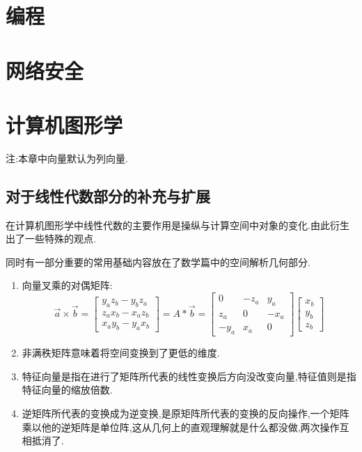 \documentclass[UTF8,12pt]{ctexbook}
\begin{document}
{{  \section{编程}{


   }%

  \section{网络安全}{


   }%

  \section{计算机图形学}{
    注:本章中向量默认为列向量.

    \subsection{对于线性代数部分的补充与扩展}{

      在计算机图形学中线性代数的主要作用是操纵与计算空间中对象的变化.由此衍生出了一些特殊的观点.

      同时有一部分重要的常用基础内容放在了数学篇中的空间解析几何部分.

      \begin{enumerate}
        \item {向量叉乘的对偶矩阵:
              $$\vec{a} \times \vec{b}
                =
                \begin{bmatrix}
                  y_az_b - y_bz_a \\
                  z_ax_b - x_az_b \\
                  x_ay_b - y_ax_b
                \end{bmatrix}
                =
                A * \vec{b}
                =
                \begin{bmatrix}
                  0    & -z_a & y_a  \\
                  z_a  & 0    & -x_a \\
                  -y_a & x_a  & 0
                \end{bmatrix}
                \begin{bmatrix}
                  x_b \\
                  y_b \\
                  z_b
                \end{bmatrix}
              $$
              }
        \item 非满秩矩阵意味着将空间变换到了更低的维度.
        \item 特征向量是指在进行了矩阵所代表的线性变换后方向没改变向量,特征值则是指特征向量的缩放倍数.
        \item 逆矩阵所代表的变换成为逆变换,是原矩阵所代表的变换的反向操作,一个矩阵乘以他的逆矩阵是单位阵,这从几何上的直观理解就是什么都没做,两次操作互相抵消了.
      \end{enumerate}
    }

}}}
\end{document}
